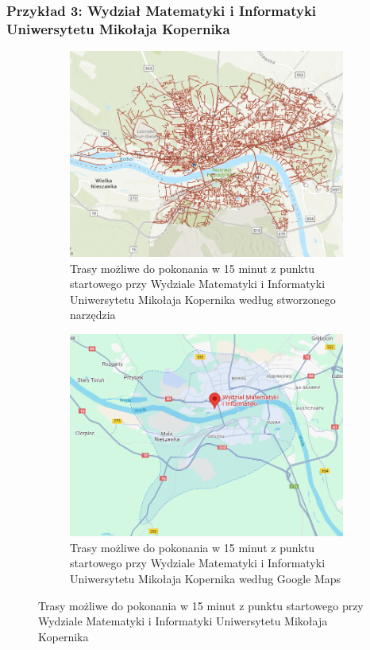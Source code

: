 \documentclass{article}
\begin{document}
\subsubsection{Przykład 3: Wydział Matematyki i Informatyki Uniwersytetu Mikołaja Kopernika}
\begin{figure}[H]
    \centering
    \begin{subfigure}[b]{0.45\textwidth}
        \centering
        \includegraphics[width=\textwidth]{img/uniwersytet-15-min.png}
        \caption{Trasy możliwe do pokonania w 15 minut z punktu startowego przy Wydziale Matematyki i Informatyki Uniwersytetu Mikołaja Kopernika według stworzonego narzędzia}
    \end{subfigure}
    \hfill
    \begin{subfigure}[b]{0.45\textwidth}
        \centering
        \includegraphics[width=\textwidth]{img/uniwersytet-15-min-google.png}
        \caption{Trasy możliwe do pokonania w 15 minut z punktu startowego przy Wydziale Matematyki i Informatyki Uniwersytetu Mikołaja Kopernika według Google Maps}
    \end{subfigure}
    \caption{Trasy możliwe do pokonania w 15 minut z punktu startowego przy Wydziale Matematyki i Informatyki Uniwersytetu Mikołaja Kopernika}
\end{figure}
\end{document}
